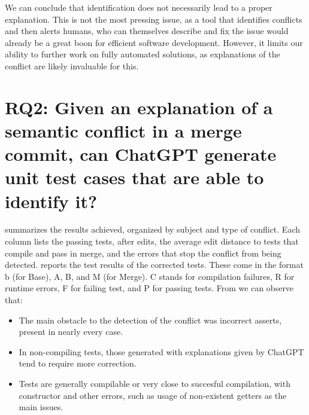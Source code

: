 We can conclude that identification does not necessarily lead to a proper explanation. 
This is not the most pressing issue, as a tool that identifies conflicts and then alerts humans, who can themselves describe and fix the issue would already be a great boon for efficient software development.
However, it limits our ability to further work on fully automated solutions, as explanations of the conflict are likely invaluable for this.


\section{RQ2: Given an explanation of a semantic conflict in a merge
commit, can ChatGPT generate unit test cases that are able to identify it?}\label{sec:results:rq2}

 summarizes the results achieved, organized by subject and
type of conflict.
Each column lists the passing tests, after edits, the average edit distance to tests that compile and pass in merge,
and the errors that stop the conflict from being detected.
%
 reports the test results of the corrected tests.
These come in the format b (for Base), A, B, and M (for Merge). C stands for compilation failures, R for runtime errors, F for failing test, and P for passing tests.
From  we can observe that:
\begin{itemize}
  \item The main obstacle to the detection of the conflict was incorrect asserts, present in nearly every case.
  \item In non-compiling tests, those generated with explanations given by ChatGPT tend to require more correction.
  \item Tests are generally compilable or very close to succesful compilation, with constructor and other errors, such as usage of non-existent getters as the main issues.
\end{itemize}

